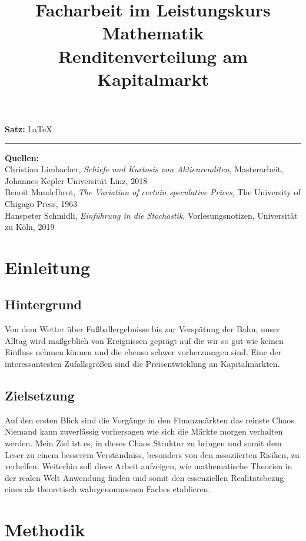 \documentclass[12pt, a4paper]{report}
\title{\LARGE   Facharbeit im Leistungskurs Mathematik  \vspace*{0.5cm} \\
  \Huge Renditenverteilung am Kapitalmarkt}
\theoremstyle{definition}
\begin{document}
\maketitle
\newpage
\vspace*{\fill}
\begin{normalsize}
\noindent
  \textbf{Satz:}
  \LaTeX
\end{normalsize}
\vspace*{5pt}
\hrule
\vspace{5pt}
\noindent
\textbf{Quellen:}
\\
Christian Limbacher, \textit{Schiefe und Kurtosis von Aktienrenditen}, Masterarbeit, Johannes Kepler Universität Linz, 2018 \\
Benoit Mandelbrot, \textit{The Variation of certain speculative Prices}, The University of Chigago Press, 1963 \\
Hanspeter Schmidli, \textit{Einführung in die Stochastik}, Vorlesungsnotizen, Universität zu Köln, 2019
\tableofcontents
\newpage
\chapter{Einleitung}
\section{Hintergrund}
Von dem Wetter über Fußballergebnisse bis zur Verspätung der Bahn, unser Alltag wird maßgeblich von Ereignissen geprägt auf die wir so gut wie keinen Einfluss nehmen können und die ebenso schwer vorherzusagen sind. Eine der interessantesten Zufallsgrößen sind die Preisentwicklung an Kapitalmärkten.
\section{Zielsetzung}
Auf den ersten Blick sind die Vorgänge in den Finanzmärkten das reinste Chaos. Niemand kann zuverlässig vorhersagen wie sich die Märkte morgen verhalten werden. Mein Ziel ist es, in dieses Chaos Struktur zu bringen und somit dem Leser zu einem besserem Verständniss, besonders von den assoziierten Risiken, zu verhelfen. Weiterhin soll diese Arbeit aufzeigen, wie mathematische Theorien in der realen Welt Anwendung finden und somit den essenziellen Realitätsbezug eines als theoretisch wahrgenommenen Faches etablieren.

\chapter{Methodik}
\end{document}
